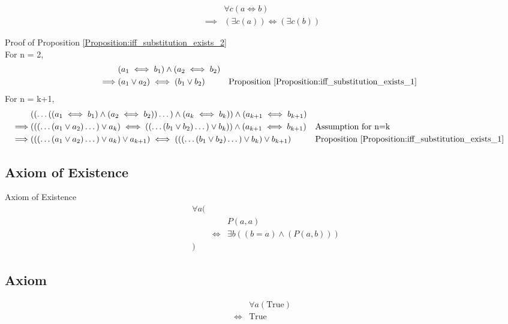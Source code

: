 \begin{prop}
\label{Proposition:iff_substitution_exists_2}
\begin{align*}
& \forall c (a \iff b) \\
\implies & (\exists c (a)) \iff (\exists c (b))
\end{align*}
\end{prop}

Proof of Proposition \ref{Proposition:iff_substitution_exists_2} \\
For n = 2,
\begin{align*}
& (a_1 \iff b_1) \land (a_2 \iff b_2) \\
\implies & (a_1 \lor a_2) \iff (b_1 \lor b_2)
& & \text{Proposition \ref{Proposition:iff_substitution_exists_1}} \\
\end{align*}
For n = k+1,
\begin{align*}
& (( \dots ((a_1 \iff b_1) \land (a_2 \iff b_2)) \dots ) \land (a_k \iff b_k)) \land (a_{k+1} \iff b_{k+1}) \\
\implies & ((( \dots (a_1 \lor a_2) \dots ) \lor a_k) \iff (( \dots (b_1 \lor b_2) \dots ) \lor b_k)) \land (a_{k+1} \iff b_{k+1})
& & \text{Assumption for n=k} \\
\implies & ((( \dots (a_1 \lor a_2) \dots ) \lor a_k) \lor a_{k+1}) \iff ((( \dots (b_1 \lor b_2) \dots ) \lor b_k) \lor b_{k+1})
& & \text{Proposition \ref{Proposition:iff_substitution_exists_1}} \\
\end{align*}

\subsection{Axiom of Existence}
\begin{axm}
\label{Axiom:axiom_of_existence}
Axiom of Existence
\begin{align*}
& \forall a ( \\
& & & P(a,a) \\
& & \iff & \exists b ((b = a) \land (P(a,b))) \\
& )
\end{align*}
\end{axm}

\subsection{Axiom}
\begin{axm}
\label{Axiom:forall_true}
\begin{align*}
& \forall a (\text{True}) \\
\iff & \text{True}
\end{align*}
\end{axm}

